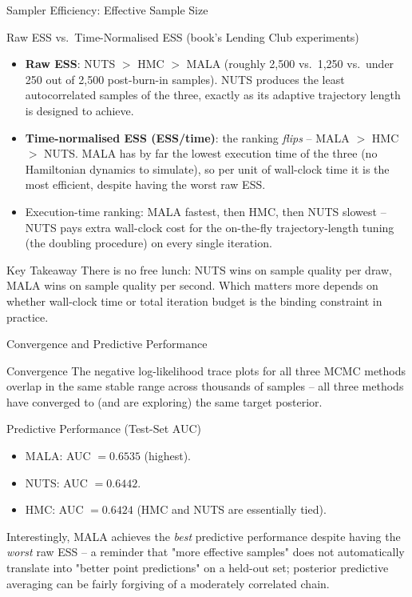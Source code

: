 \documentclass[aspectratio=169,10pt]{beamer}
\begin{document}
\begin{frame}{Sampler Efficiency: Effective Sample Size}

\begin{block}{Raw ESS vs.\ Time-Normalised ESS (book's Lending Club experiments)}
\begin{itemize}
  \item \textbf{Raw ESS}: NUTS $>$ HMC $>$ MALA (roughly 2{,}500 vs.\ 1{,}250 vs.\ under 250 out of 2{,}500 post-burn-in samples). NUTS produces the least autocorrelated samples of the three, exactly as its adaptive trajectory length is designed to achieve.
  \item \textbf{Time-normalised ESS (ESS/time)}: the ranking \emph{flips} -- MALA $>$ HMC $>$ NUTS. MALA has by far the lowest execution time of the three (no Hamiltonian dynamics to simulate), so per unit of wall-clock time it is the most efficient, despite having the worst raw ESS.
  \item Execution-time ranking: MALA fastest, then HMC, then NUTS slowest -- NUTS pays extra wall-clock cost for the on-the-fly trajectory-length tuning (the doubling procedure) on every single iteration.
\end{itemize}
\end{block}

\begin{alertblock}{Key Takeaway}
There is no free lunch: NUTS wins on sample quality per draw, MALA wins on sample quality per second. Which matters more depends on whether wall-clock time or total iteration budget is the binding constraint in practice.
\end{alertblock}
\end{frame}

\begin{frame}{Convergence and Predictive Performance}

\begin{block}{Convergence}
The negative log-likelihood trace plots for all three MCMC methods overlap in the same stable range across thousands of samples -- all three methods have converged to (and are exploring) the same target posterior.
\end{block}

\begin{block}{Predictive Performance (Test-Set AUC)}
\begin{itemize}
  \item MALA: AUC $= 0.6535$ (highest).
  \item NUTS: AUC $= 0.6442$.
  \item HMC: AUC $= 0.6424$ (HMC and NUTS are essentially tied).
\end{itemize}
Interestingly, MALA achieves the \emph{best} predictive performance despite having the \emph{worst} raw ESS -- a reminder that "more effective samples" does not automatically translate into "better point predictions" on a held-out set; posterior predictive averaging can be fairly forgiving of a moderately correlated chain.
\end{block}
\end{frame}
\end{document}
